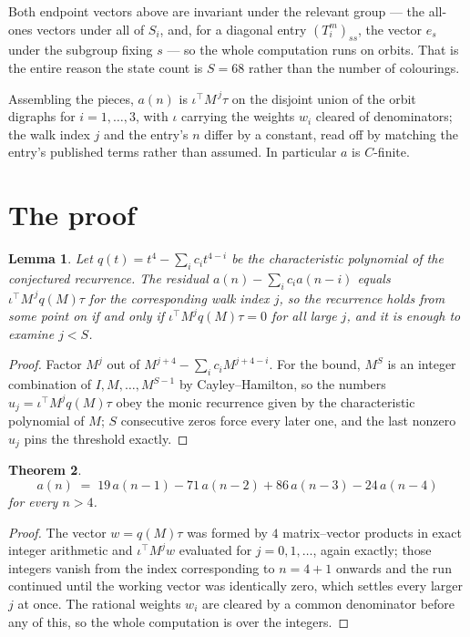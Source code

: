 \documentclass[11pt,a4paper]{article}
\theoremstyle{plain}
\newtheorem{theorem}{Theorem}
\newtheorem{lemma}[theorem]{Lemma}
\theoremstyle{definition}
\begin{document}
Both endpoint vectors above are invariant under the relevant group --- the all-ones vectors
under all of $S_i$, and, for a diagonal entry $(T_i^m)_{ss}$, the vector $e_s$ under the
subgroup fixing $s$ --- so the whole computation runs on orbits. That is the entire reason the
state count is $S=68$ rather than the number of colourings.

Assembling the pieces, $a(n)$ is $\iota^{\!\top}M^{\,j}\tau$ on the disjoint union of the
orbit digraphs for $i=1,\dots,3$, with $\iota$ carrying the weights $w_i$ cleared of
denominators; the walk index $j$ and the entry's $n$ differ by a constant, read off by
matching the entry's published terms rather than assumed. In particular $a$ is $C$-finite.

\section{The proof}

\begin{lemma}\label{lem:crit}
Let $q(t)=t^{4}-\sum_i c_it^{4-i}$ be the characteristic polynomial of the
conjectured recurrence. The residual $a(n)-\sum_ic_ia(n-i)$ equals
$\iota^{\!\top}M^{\,j}q(M)\tau$ for the corresponding walk index $j$, so the recurrence
holds from some point on if and only if $\iota^{\!\top}M^{j}q(M)\tau=0$ for all large $j$,
and it is enough to examine $j<S$.
\end{lemma}

\begin{proof}
Factor $M^{j}$ out of $M^{j+4}-\sum_ic_iM^{j+4-i}$. For the bound, $M^{S}$
is an integer combination of $I,M,\dots,M^{S-1}$ by Cayley--Hamilton, so the numbers
$u_j=\iota^{\!\top}M^{j}q(M)\tau$ obey the monic recurrence given by the characteristic
polynomial of $M$; $S$ consecutive zeros force every later one, and the last nonzero $u_j$
pins the threshold exactly.
\end{proof}

\begin{theorem}
\[
a(n)\;=\;19\,a(n-1) - 71\,a(n-2) + 86\,a(n-3) - 24\,a(n-4)
\]
for every $n>4$.
\end{theorem}

\begin{proof}
The vector $w=q(M)\tau$ was formed by $4$ matrix--vector products in exact integer
arithmetic and $\iota^{\!\top}M^{j}w$ evaluated for $j=0,1,\dots$, again exactly; those
integers vanish from the index corresponding to $n=4+1$ onwards and the run continued
until the working vector was identically zero, which settles every larger $j$ at once. The
rational weights $w_i$ are cleared by a common denominator before any of this, so the whole
computation is over the integers.
\end{proof}
\end{document}
